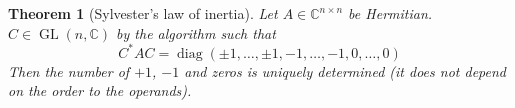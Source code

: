 \documentclass[a4paper]{article}
\newcounter{lecref}[section]
\numberwithin{lecref}{section}
\newtheorem{theorem}[lecref]{Theorem}
\begin{document}
\begin{theorem}[Sylvester's law of inertia]
  Let $A \in \mathbb C^{n\times n}$ be Hermitian.
  $C \in \operatorname{GL}(n, \mathbb C)$ by the algorithm
  such that
  \[ C^* AC = %
    \operatorname{diag}(\pm 1, \dots, \pm 1, -1, \dots, -1, 0, \dots, 0)
  \]
  Then the number of $+1$, $-1$ and zeros is uniquely determined
  (it does not depend on the order to the operands).
\end{theorem}
\end{document}
